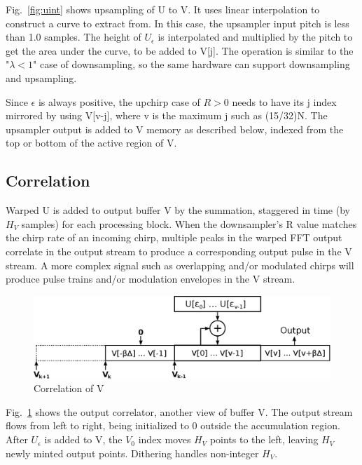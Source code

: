 Fig.~\ref{fig:uint} shows upsampling of U to V. It uses linear interpolation to
construct a curve to extract from.
In this case, the upsampler input pitch is less than 1.0 samples.
The height of $U_\epsilon$ is interpolated and multiplied by the pitch to get
the area under the curve, to be added to V[j].
The operation is similar to the "$\lambda < 1$" case of downsampling,
so the same hardware can support downsampling and upsampling.

Since $\epsilon$ is always positive, the upchirp case of $R>0$ needs to have its
j index mirrored by using V[v-j], where v is the maximum j such as (15/32)N.
The upsampler output is added to V memory as described below, indexed from the
top or bottom of the active region of V. 

\subsection{Correlation}

Warped U is added to output buffer V by the summation,
staggered in time (by $H_V$ samples) for each processing block.
When the downsampler's R value matches the chirp rate of an incoming chirp,
multiple peaks in the warped FFT output correlate in the output stream to
produce a corresponding output pulse in the V stream.
A more complex signal such as overlapping and/or modulated chirps will produce
pulse trains and/or modulation envelopes in the V stream.

\begin{figure}
	\centering
	\includegraphics[width=0.99\linewidth]{../source/wbuf_e}
	\caption[W correlation]{Correlation of V}
	\label{fig:wbuf}
\end{figure}

Fig.~\ref{fig:wbuf} shows the output correlator, another view of buffer V.
The output stream flows from left to right,
being initialized to 0 outside the accumulation region.
After $U_\epsilon$ is added to V, the $V_0$ index moves $H_V$ points
to the left, leaving $H_V$ newly minted output points.
Dithering handles non-integer $H_V$.

